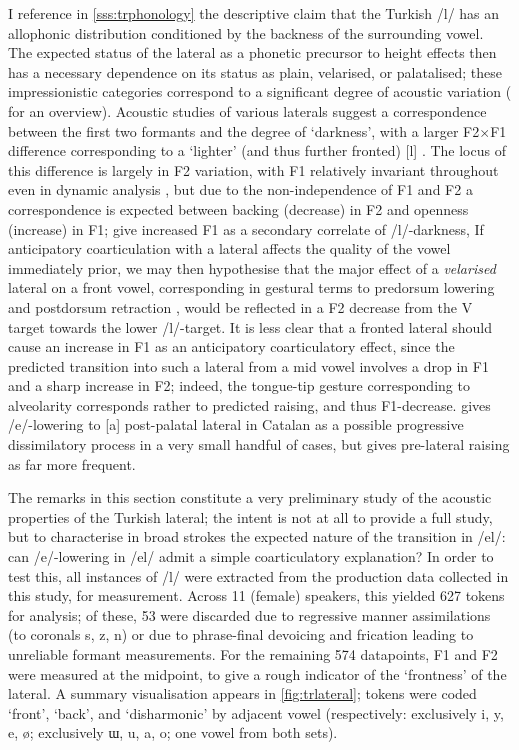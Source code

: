 I reference in \cref{sss:trphonology} the descriptive claim that the Turkish /l/ has an allophonic distribution conditioned by the backness of the surrounding vowel. The expected status of the lateral as a phonetic precursor to height effects then has a necessary dependence on its status as plain, velarised, or palatalised; these impressionistic categories correspond to a significant degree of acoustic variation (\citealt{Proctor2009} for an overview). Acoustic studies of various laterals suggest a correspondence between the first two formants and the degree of `darkness', with a larger F2$\times$F1 difference corresponding to a `lighter' (and thus further fronted) [l] \citep{Sproat1993,Turton2014,Carter2002,Recasens2005}. The locus of this difference is largely in F2 variation, with F1 relatively invariant throughout even in dynamic analysis \citep{Strycharczuk2016}, but due to the non-independence of F1 and F2 a correspondence is expected between backing (decrease) in F2 and openness (increase) in F1; \cite{Sproat1993,Carter2007} give increased F1 as a secondary correlate of /l/-darkness,  If anticipatory coarticulation with a lateral affects the quality of the vowel immediately prior, we may then hypothesise that the major effect of a \emph{velarised} lateral on a front vowel, corresponding in gestural terms to predorsum lowering and postdorsum retraction \citep{Recasens2012}, would be reflected in a F2 decrease from the V target towards the lower /l/-target. It is less clear that a fronted lateral should cause an increase in F1 as an anticipatory coarticulatory effect, since the predicted transition into such a lateral from a mid vowel involves a drop in F1 and a sharp increase in F2; indeed, the tongue-tip gesture corresponding to alveolarity corresponds rather to predicted raising, and thus F1-decrease. \cite{Recasens2014} gives /e/-lowering to [a] post-palatal lateral in Catalan as a possible progressive dissimilatory process in a very small handful of cases, but gives pre-lateral raising as far more frequent.

The remarks in this section constitute a very preliminary study of the acoustic properties of the Turkish lateral; the intent is not at all to provide a full study, but to characterise in broad strokes the expected nature of the transition in /el/: can /e/-lowering in /el/ admit a simple coarticulatory explanation? In order to test this, all instances of /l/ were extracted from the production data collected in this study, for measurement. Across 11 (female) speakers, this yielded 627 tokens for analysis; of these, 53 were discarded due to regressive manner assimilations (to coronals s, z, n) or due to phrase-final devoicing and frication leading to unreliable formant measurements. For the remaining 574 datapoints, F1 and F2 were measured at the midpoint, to give a rough indicator of the `frontness' of the lateral. A summary visualisation appears in \cref{fig:trlateral}; tokens were coded `front', `back', and `disharmonic' by adjacent vowel (respectively: exclusively i, y, e, \o; exclusively ɯ, u, a, o; one vowel from both sets).

